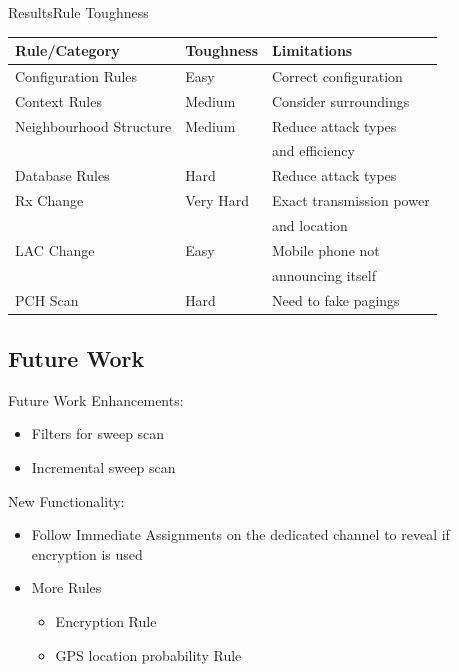 \documentclass{beamer}
\begin{document}
\begin{frame}{Results}{Rule Toughness}
\vspace{-.6cm}
\begin{center}
\begin{tabular}{lll}
\toprule
Rule/Category		&Toughness	    &Limitations\\
\midrule
Configuration Rules	&Easy		    &Correct configuration\\
\midrule
Context Rules		&Medium		    &Consider surroundings\\
Neighbourhood Structure	&Medium		    &Reduce attack types\\
			&		    &and efficiency\\
\midrule
Database Rules		&Hard		    &Reduce attack types\\
Rx Change		&Very Hard	    &Exact transmission power\\
			&		    &and location\\
LAC Change		&Easy		    &Mobile phone not\\
			&		    &announcing itself\\
\midrule
PCH Scan		&Hard		    &Need to fake pagings\\
\bottomrule
\end{tabular}
\end{center}
\end{frame}

\subsection{Future Work}
\begin{frame}{Future Work}
Enhancements:
\begin{itemize}
    \item Filters for sweep scan
    \item Incremental sweep scan
\end{itemize}
New Functionality:
\begin{itemize}
    \item Follow Immediate Assignments on the dedicated channel to reveal if encryption is used
    \item More Rules
    \begin{itemize}
	\item Encryption Rule
	\item GPS location probability Rule
    \end{itemize}
\end{itemize}
\end{frame}
\end{document}
